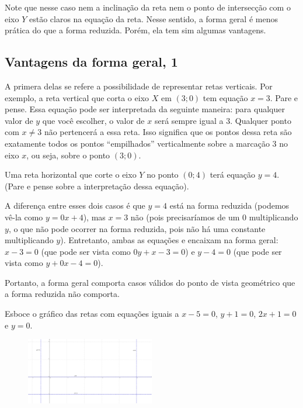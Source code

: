 \documentclass[main.tex]{subfiles}
\begin{document}
Note que nesse caso nem a inclinação da reta nem o ponto de intersecção com o eixo $Y$ estão claros na equação da reta. Nesse sentido, a forma geral é menos prática do que a forma reduzida. Porém, ela tem sim algumas vantagens.

\subsection*{Vantagens da forma geral, 1}

A primera delas se refere a possibilidade de representar retas verticais. Por exemplo, a reta vertical que corta o eixo $X$ em $(3;0)$ tem equação $x=3$. Pare e pense. Essa equação pode ser interpretada da seguinte maneira: para qualquer valor de $y$ que você escolher, o valor de $x$ será sempre igual a $3$. Qualquer ponto com $x\neq3$ não pertencerá a essa reta. Isso significa que os pontos dessa reta são exatamente todos os pontos ``empilhados'' verticalmente sobre a marcação $3$ no eixo $x$, ou seja, sobre o ponto $(3;0)$.

Uma reta horizontal que corte o eixo $Y$ no ponto $(0;4)$ terá equação $y=4$. (Pare e pense sobre a interpretação dessa equação).

A diferença entre esses dois casos é que $y=4$ está na forma reduzida (podemos vê-la como $y=0x+4$), mas $x=3$ não (pois precisaríamos de um $0$ multiplicando $y$, o que não pode ocorrer na forma reduzida, pois não há uma constante multiplicando $y$). Entretanto, ambas as equações e encaixam na forma geral: $x-3=0$ (que pode ser vista como $0y+x-3=0$) e $y-4=0$ (que pode ser vista como $y+0x-4=0$).

Portanto, a forma geral comporta casos válidos do ponto de vista geométrico que a forma reduzida não comporta.

\begin{questao}
Esboce o gráfico das retas com equações iguais a $x-5=0$, $y+1=0$, $2x+1=0$ e $y=0$.
\end{questao}


\begin{gabarito}
	\begin{gabaritoQuestao}
		\begin{figure}[h]
            \centering
            \includegraphics[width=0.5\textwidth]{./img/c6g7.png}
        \end{figure}
	\end{gabaritoQuestao}
\end{gabarito}
\end{document}
